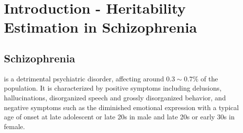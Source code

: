 \documentclass{book}
\newcommand*{\Glng}{\Glsentrylong}
\begin{document}
	
	\chapter{Introduction - Heritability Estimation in Schizophrenia}
	\section{Schizophrenia}
	\Glng{scz} is a detrimental psychiatric disorder, affecting around $0.3\sim0.7\%$ of the population\citep{AmericanPsychiatricAssociation2013}.
	It is characterized by positive symptoms including delusions, hallucinations, disorganized speech and grossly disorganized behavior, and negative symptoms such as the diminished emotional expression\citep{AmericanPsychiatricAssociation2013} with a typical age of onset at late adolescent or late 20s in male and late 20s or early 30s in female\citep{Schultz2007}.
	
\end{document}
